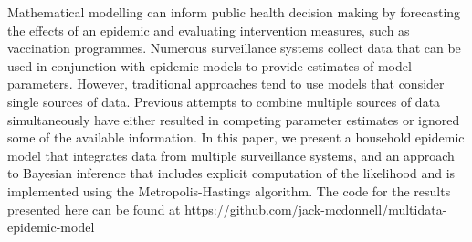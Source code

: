 
\noindent Mathematical modelling can inform public health decision making by forecasting the effects of an epidemic and evaluating intervention measures, such as vaccination programmes.
Numerous surveillance systems collect data that can be used in conjunction with epidemic models to provide estimates of model parameters. However, traditional approaches tend to use models that consider single sources of data. Previous attempts to combine multiple sources of data simultaneously have either resulted in competing parameter estimates or ignored some of the available information.
In this paper, we present a household epidemic model that integrates data from multiple surveillance systems, and an approach to Bayesian inference that includes explicit computation of the likelihood and is implemented using the Metropolis-Hastings algorithm. The code for the results presented here can be found at 
https://github.com/jack-mcdonnell/multidata-epidemic-model